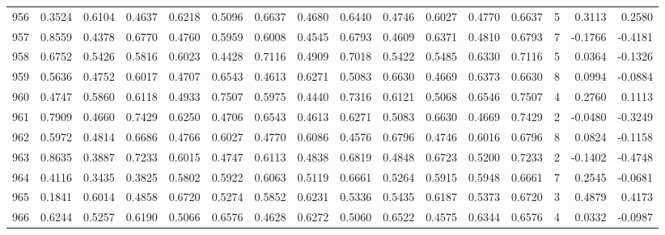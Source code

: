 \begin{tabular}{lrrrrrrrrrrrrrrr}
956 &      0.3524 &  0.6104 &  0.4637 &  0.6218 &  0.5096 &  0.6637 &  0.4680 &  0.6440 &  0.4746 &  0.6027 &   0.4770 &     0.6637 &      5 &                    0.3113 &                     0.2580 \\
957 &      0.8559 &  0.4378 &  0.6770 &  0.4760 &  0.5959 &  0.6008 &  0.4545 &  0.6793 &  0.4609 &  0.6371 &   0.4810 &     0.6793 &      7 &                   -0.1766 &                    -0.4181 \\
958 &      0.6752 &  0.5426 &  0.5816 &  0.6023 &  0.4428 &  0.7116 &  0.4909 &  0.7018 &  0.5422 &  0.5485 &   0.6330 &     0.7116 &      5 &                    0.0364 &                    -0.1326 \\
959 &      0.5636 &  0.4752 &  0.6017 &  0.4707 &  0.6543 &  0.4613 &  0.6271 &  0.5083 &  0.6630 &  0.4669 &   0.6373 &     0.6630 &      8 &                    0.0994 &                    -0.0884 \\
960 &      0.4747 &  0.5860 &  0.6118 &  0.4933 &  0.7507 &  0.5975 &  0.4440 &  0.7316 &  0.6121 &  0.5068 &   0.6546 &     0.7507 &      4 &                    0.2760 &                     0.1113 \\
961 &      0.7909 &  0.4660 &  0.7429 &  0.6250 &  0.4706 &  0.6543 &  0.4613 &  0.6271 &  0.5083 &  0.6630 &   0.4669 &     0.7429 &      2 &                   -0.0480 &                    -0.3249 \\
962 &      0.5972 &  0.4814 &  0.6686 &  0.4766 &  0.6027 &  0.4770 &  0.6086 &  0.4576 &  0.6796 &  0.4746 &   0.6016 &     0.6796 &      8 &                    0.0824 &                    -0.1158 \\
963 &      0.8635 &  0.3887 &  0.7233 &  0.6015 &  0.4747 &  0.6113 &  0.4838 &  0.6819 &  0.4848 &  0.6723 &   0.5200 &     0.7233 &      2 &                   -0.1402 &                    -0.4748 \\
964 &      0.4116 &  0.3435 &  0.3825 &  0.5802 &  0.5922 &  0.6063 &  0.5119 &  0.6661 &  0.5264 &  0.5915 &   0.5948 &     0.6661 &      7 &                    0.2545 &                    -0.0681 \\
965 &      0.1841 &  0.6014 &  0.4858 &  0.6720 &  0.5274 &  0.5852 &  0.6231 &  0.5336 &  0.5435 &  0.6187 &   0.5373 &     0.6720 &      3 &                    0.4879 &                     0.4173 \\
966 &      0.6244 &  0.5257 &  0.6190 &  0.5066 &  0.6576 &  0.4628 &  0.6272 &  0.5060 &  0.6522 &  0.4575 &   0.6344 &     0.6576 &      4 &                    0.0332 &                    -0.0987 \\

\end{tabular}
